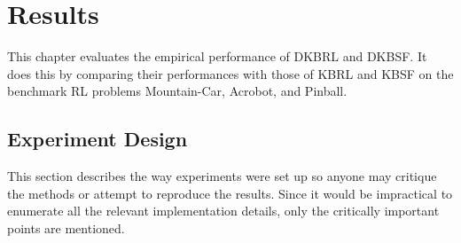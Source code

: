 \chapter{Results}
This chapter evaluates the empirical performance of DKBRL and DKBSF.
It does this by comparing their performances with those of KBRL and KBSF
on the benchmark RL problems Mountain-Car, Acrobot, and Pinball.

\section{Experiment Design}
This section describes the way experiments were set up so anyone may
critique the methods or attempt to reproduce the results.
Since it would be impractical to enumerate all the relevant implementation
details, only the critically important points are mentioned.

